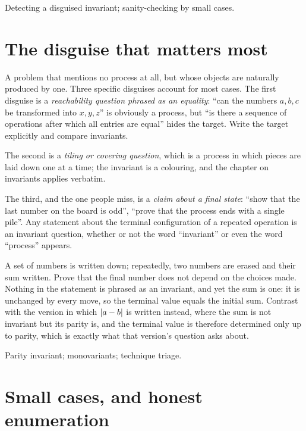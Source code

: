 \begin{seealsob}Detecting a disguised invariant; sanity-checking by small cases.\end{seealsob}

\section{The disguise that matters most}

\cue A problem that mentions no process at all, but whose objects are naturally produced by one. Three specific disguises account for most cases.
\method The first disguise is a \emph{reachability question phrased as an equality}: ``can the numbers $a,b,c$ be transformed into $x,y,z$'' is obviously a process, but ``is there a sequence of operations after which all entries are equal'' hides the target. Write the target explicitly and compare invariants.

The second is a \emph{tiling or covering question}, which is a process in which pieces are laid down one at a time; the invariant is a colouring, and the chapter on invariants applies verbatim.

The third, and the one people miss, is a \emph{claim about a final state}: ``show that the last number on the board is odd'', ``prove that the process ends with a single pile''. Any statement about the terminal configuration of a repeated operation is an invariant question, whether or not the word ``invariant'' or even the word ``process'' appears.

\begin{worked}
A set of numbers is written down; repeatedly, two numbers are erased and their sum written. Prove that the final number does not depend on the choices made. Nothing in the statement is phrased as an invariant, and yet the sum is one: it is unchanged by every move, so the terminal value equals the initial sum. Contrast with the version in which $\left\lvert a-b\right\rvert$ is written instead, where the sum is not invariant but its parity is, and the terminal value is therefore determined only up to parity, which is exactly what that version's question asks about.
\end{worked}

\begin{seealsob}Parity invariant; monovariants; technique triage.\end{seealsob}

\section{Small cases, and honest enumeration}


